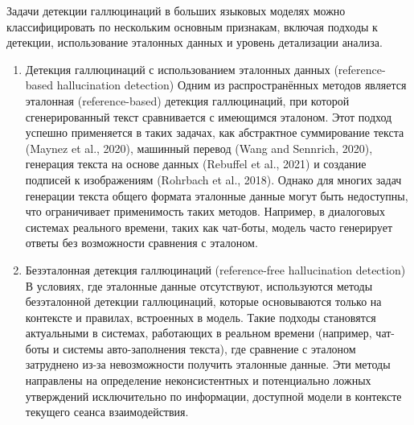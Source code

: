 \documentclass[12pt]{article}
\begin{document}
Задачи детекции галлюцинаций в больших языковых моделях можно классифицировать по нескольким основным признакам, включая подходы к детекции, использование эталонных данных и уровень детализации анализа. 
\begin{enumerate}
\item Детекция галлюцинаций с использованием эталонных данных (reference-based hallucination detection)  
   Одним из распространённых методов является эталонная (reference-based) детекция галлюцинаций, при которой сгенерированный текст сравнивается с имеющимся эталоном. Этот подход успешно применяется в таких задачах, как абстрактное суммирование текста (Maynez et al., 2020), машинный перевод (Wang and Sennrich, 2020), генерация текста на основе данных (Rebuffel et al., 2021) и создание подписей к изображениям (Rohrbach et al., 2018). Однако для многих задач генерации текста общего формата эталонные данные могут быть недоступны, что ограничивает применимость таких методов. Например, в диалоговых системах реального времени, таких как чат-боты, модель часто генерирует ответы без возможности сравнения с эталоном. 

\item Безэталонная детекция галлюцинаций (reference-free hallucination detection) 
   В условиях, где эталонные данные отсутствуют, используются методы безэталонной детекции галлюцинаций, которые основываются только на контексте и правилах, встроенных в модель. Такие подходы становятся актуальными в системах, работающих в реальном времени (например, чат-боты и системы авто-заполнения текста), где сравнение с эталоном затруднено из-за невозможности получить эталонные данные. Эти методы направлены на определение неконсистентных и потенциально ложных утверждений исключительно по информации, доступной модели в контексте текущего сеанса взаимодействия.
\end{enumerate}
\end{document}
